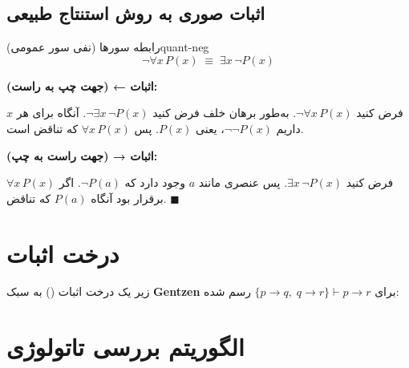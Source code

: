 \documentclass[12pt,a4paper,twoside]{book}
\begin{document}
\subsection{اثبات صوری به روش استنتاج طبیعی}
\label{subsec:natded}

\begin{theorem}{رابطه سورها (نفی سور عمومی)}{quant-neg}
  \begin{equation}
    \neg \forall x\, P(x) \;\equiv\; \exists x\, \neg P(x)
    \label{eq:quant-neg}
  \end{equation}
\end{theorem}

\begin{proofbox}
  \textbf{اثبات ← (جهت چپ به راست):}

  فرض کنید $\neg\forall x\, P(x)$.
  به‌طور برهان خلف فرض کنید
  $\neg\exists x\,\neg P(x)$.
  آنگاه برای هر $x$ داریم $\neg\neg P(x)$،
  یعنی $P(x)$. پس $\forall x\, P(x)$ که تناقض است.

  \medskip
  \textbf{اثبات → (جهت راست به چپ):}

  فرض کنید $\exists x\,\neg P(x)$.
  پس عنصری مانند $a$ وجود دارد که $\neg P(a)$.
  اگر $\forall x\, P(x)$ برقرار بود آنگاه $P(a)$ که تناقض.
  \hfill$\blacksquare$
\end{proofbox}

\section{درخت اثبات}
\label{sec:prooftree}

زیر یک درخت اثبات () به سبک
\textbf{Gentzen} برای
$\{p \to q,\; q \to r\} \vdash p \to r$
رسم شده:

\begin{center}
\end{center}

\section{الگوریتم بررسی تاتولوژی}
\label{sec:algo}
\end{document}
